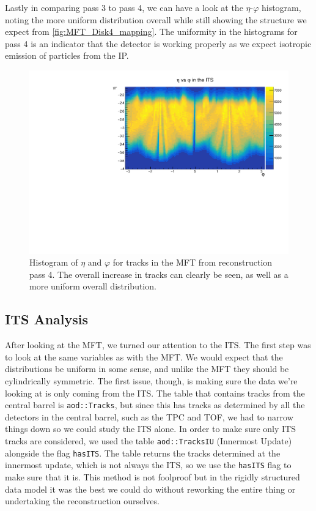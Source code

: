 Lastly in comparing pass 3 to pass 4, we can have a look at the $\eta$-$\varphi$ histogram, noting the more uniform distribution overall while still showing the structure we expect from \cref{fig:MFT_Disk4_mapping}. The uniformity in the histograms for pass 4 is an indicator that the detector is working properly as we expect isotropic emission of particles from the IP. 

\begin{figure}[h]
    \begin{center}
        \includegraphics[width=.8\textwidth]{Plots/pass4_MFT/eta_phi_pass4.pdf}
        \caption{Histogram of $\eta$ and $\varphi$ for tracks in the MFT from reconstruction pass 4. The overall increase in tracks can clearly be seen, as well as a more uniform overall distribution.}
        \label{fig:eta_phi_pass4}
    \end{center}
\end{figure}

\subsection{ITS Analysis}
After looking at the MFT, we turned our attention to the ITS. The first step was to look at the same variables as with the MFT. We would expect that the distributions be uniform in some sense, and unlike the MFT they should be cylindrically symmetric. The first issue, though, is making sure the data we're looking at is only coming from the ITS. The table that contains tracks from the central barrel is \texttt{aod::Tracks}, but since this has tracks as determined by all the detectors in the central barrel, such as the TPC and TOF, we had to narrow things down so we could study the ITS alone. In order to make sure only ITS tracks are considered, we used the table \texttt{aod::TracksIU} (Innermost Update) alongside the flag \texttt{hasITS}. The table returns the tracks determined at the innermost update, which is not always the ITS, so we use the \texttt{hasITS} flag to make sure that it is. This method is not foolproof but in the rigidly structured data model it was the best we could do without reworking the entire thing or undertaking the reconstruction ourselves.

